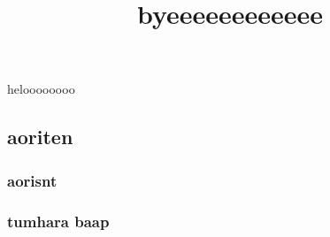 \documentclass{article}
\begin{document}
heloooooooo
\title{byeeeeeeeeeeee}
\subsection*{aoriten}
\subsubsection*{aorisnt}
\subsubsection*{tumhara baap}
\end{document}
